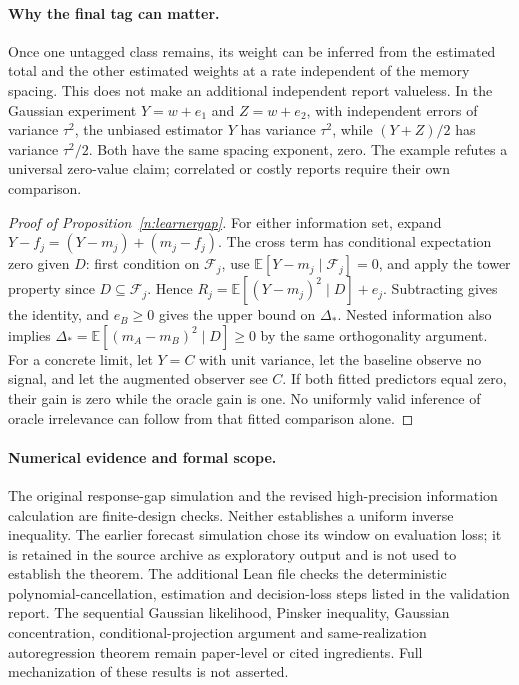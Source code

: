 \paragraph{Why the final tag can matter.} Once one untagged class remains, its weight can be inferred from the estimated total and the other estimated weights at a rate independent of the memory spacing. This does not make an additional independent report valueless. In the Gaussian experiment $Y=w+e_1$ and $Z=w+e_2$, with independent errors of variance $\tau^2$, the unbiased estimator $Y$ has variance $\tau^2$, while $(Y+Z)/2$ has variance $\tau^2/2$. Both have the same spacing exponent, zero. The example refutes a universal zero-value claim; correlated or costly reports require their own comparison.

\begin{proof}[Proof of Proposition~\ref{n:learnergap}]
For either information set, expand $Y-f_j=(Y-m_j)+(m_j-f_j)$. The cross term has conditional expectation zero given $D$: first condition on $\mathcal F_j$, use $\mathbb E[Y-m_j\mid\mathcal F_j]=0$, and apply the tower property since $D\subseteq\mathcal F_j$. Hence $R_j=\mathbb E[(Y-m_j)^2\mid D]+e_j$. Subtracting gives the identity, and $e_B\ge0$ gives the upper bound on $\Delta_*$. Nested information also implies $\Delta_*=\mathbb E[(m_A-m_B)^2\mid D]\ge0$ by the same orthogonality argument. For a concrete limit, let $Y=C$ with unit variance, let the baseline observe no signal, and let the augmented observer see $C$. If both fitted predictors equal zero, their gain is zero while the oracle gain is one. No uniformly valid inference of oracle irrelevance can follow from that fitted comparison alone.
\end{proof}

\paragraph{Numerical evidence and formal scope.} The original response-gap simulation and the revised high-precision information calculation are finite-design checks. Neither establishes a uniform inverse inequality. The earlier forecast simulation chose its window on evaluation loss; it is retained in the source archive as exploratory output and is not used to establish the theorem. The additional Lean file checks the deterministic polynomial-cancellation, estimation and decision-loss steps listed in the validation report. The sequential Gaussian likelihood, Pinsker inequality, Gaussian concentration, conditional-projection argument and same-realization autoregression theorem remain paper-level or cited ingredients. Full mechanization of these results is not asserted.

